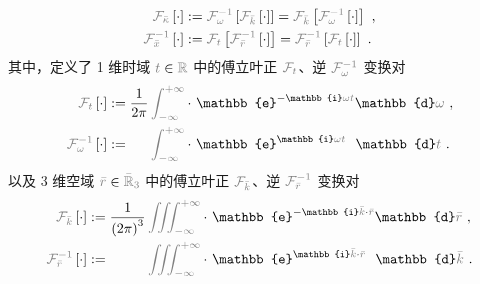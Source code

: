 \begin{subequations} \label{eq:FT-xkappa}
	\abovedisplayskip=10pt
	\belowdisplayskip=12pt
\begin{align}
	\mathcolor{gray}{\mathcal F_{\bar{\kappa}}} \left[ \cdot \right] &:= \mathcolor{gray}{\mathcal F_{\omega}^{-1}} \left[ \mathcolor{gray}{\mathcal F_{\bar{k}}} \left[ \cdot \right] \right] = \mathcolor{gray}{\mathcal F_{\bar{k}}} \left[ \mathcolor{gray}{\mathcal F_{\omega}^{-1}} \left[ \cdot \right] \right] ~, \label{eq:FT-kappa} \\
	\mathcolor{gray}{\mathcal F_{\bar{x}}^{-1}} \left[ \cdot \right] &:= \mathcolor{gray}{\mathcal F_{t}} \left[ \mathcolor{gray}{\mathcal F_{\bar{r}}^{-1}} \left[ \cdot \right] \right] = \mathcolor{gray}{\mathcal F_{\bar{r}}^{-1}} \left[ \mathcolor{gray}{\mathcal F_{t}} \left[ \cdot \right] \right] ~. \label{eq:IFT-x}
\end{align}
\end{subequations}
其中，定义了 1 维时域 $\mathcolor{gray}{t} \in \mathcolor{gray}{\mathbb{R}}$ 中的傅立叶正 $\mathcolor{gray}{\mathcal F_{t}}$、逆 $\mathcolor{gray}{\mathcal F_{\omega}^{-1}}$ 变换对
\begin{subequations} \label{eq:FT-tw}
	\abovedisplayskip=10pt
	\belowdisplayskip=12pt
\begin{align}
	\mathcolor{gray}{\mathcal F_{t}} \left[ \cdot \right] &:= \frac{ 1 }{ 2\pi } \mathcolor{gray}{\int_{-\infty}^{+\infty}} \cdot~ \mathbb{e}^{-\mathbb{i}\mathcolor{gray}{\omega} \mathcolor{gray}{t}} \mathbb{d}\mathcolor{gray}{\omega} ~, \label{eq:FT-t} \\
	\mathcolor{gray}{\mathcal F_{\omega}^{-1}} \left[ \cdot \right] &:= \hphantom{\frac{ 1 }{ 2\pi }} \mathcolor{gray}{\int_{-\infty}^{+\infty}} \cdot~ \mathbb{e}^{\mathbb{i}\mathcolor{gray}{\omega} \mathcolor{gray}{t}} \hphantom{^-} \mathbb{d}\mathcolor{gray}{t} ~. \label{eq:IFT-w}
\end{align}
\end{subequations}
以及 3 维空域 $\mathcolor{gray}{\bar{r}} \in \mathcolor{gray}{\bar{\mathbb{R}}_{3}}$ 中的傅立叶正 $\mathcolor{gray}{\mathcal F_{\bar{k}}}$、逆 $\mathcolor{gray}{\mathcal F_{\bar{r}}^{-1}}$ 变换对
\begin{subequations} \label{eq:FT-rk}
	\abovedisplayskip=10pt
	\belowdisplayskip=12pt
\begin{align}
	\mathcolor{gray}{\mathcal F_{\bar{k}}} \left[ \cdot \right] &:= \frac{ 1 }{ \left( 2\pi \right)^3 } \mathcolor{gray}{\iiint_{-\infty}^{+\infty}} \cdot~ \mathbb{e}^{-\mathbb{i}\mathcolor{gray}{\bar{k}} \cdot \mathcolor{gray}{\bar{r}}} \mathbb{d}\mathcolor{gray}{\bar{r}} ~, \label{eq:FT-k} \\
	\mathcolor{gray}{\mathcal F_{\bar{r}}^{-1}} \left[ \cdot \right] &:= \hphantom{\frac{ 1 }{ \left( 2\pi \right)^3 }} \mathcolor{gray}{\iiint_{-\infty}^{+\infty}} \cdot~ \mathbb{e}^{\mathbb{i}\mathcolor{gray}{\bar{k}} \cdot \mathcolor{gray}{\bar{r}}} \hphantom{^-} \mathbb{d}\mathcolor{gray}{\bar{k}} ~. \label{eq:IFT-r}
\end{align}
\end{subequations}
